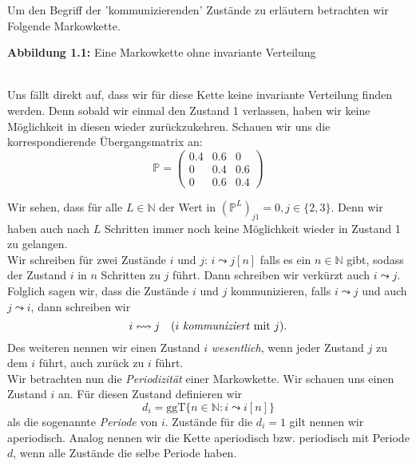 \documentclass[a4paper]{article}
\begin{document}
Um den Begriff der 'kommunizierenden' Zustände zu erläutern betrachten wir Folgende Markowkette.

\begin{center}
\end{center}
\qquad \caption{\textbf{Abbildung 1.1:} Eine Markowkette ohne invariante Verteilung}
\\

Uns fällt direkt auf, dass wir für diese Kette keine invariante Verteilung finden werden. 
Denn sobald wir einmal den Zustand 1 verlassen, haben wir keine Möglichkeit in diesen wieder
zurückzukehren.
Schauen wir uns die korrespondierende Übergangsmatrix an:
\[
\mathbb{P} = \begin{pmatrix} 
	0.4 & 0.6 & 0 \\
	0 & 0.4 & 0.6 \\
	0 & 0.6 & 0.4
\end{pmatrix} 
\]

Wir sehen, dass für alle $L \in \mathbb{N}$ der Wert in $(\mathbb{P} ^{L}) _{j1} = 0, j \in \{
	2, 3
\} $. 
Denn wir haben auch nach $L$ Schritten immer noch keine Möglichkeit wieder in Zustand 1 zu gelangen.
\\

Wir schreiben für zwei Zustände $i$ und $j$: $i \leadsto j [n]$ falls es ein $n \in \mathbb{N}$ gibt, sodass
der Zustand $i$ in $n$ Schritten zu $j$ führt. Dann schreiben wir verkürzt auch $i \leadsto j$.
Folglich sagen wir, dass die Zustände $i$ und $j$ kommunizieren, falls $i \leadsto j$ und auch
$j \leadsto i$, dann schreiben wir
\[
	i \leftrightsquigarrow j \quad \text{($i$ \textit{kommuniziert} mit $j$)}.
\]
Des weiteren nennen wir einen Zustand $i$ \textit{wesentlich}, wenn jeder Zustand $j$ zu dem $i$ führt, auch
zurück zu $i$ führt. 
\\

Wir betrachten nun die \textit{Periodizität}  einer Markowkette.
Wir schauen uns einen Zustand $i$ an. Für diesen Zustand definieren wir
\[
d_i = \text{ggT} \{
	n \in \mathbb{N} : i \leadsto i[n]
\}
\] 
als die sogenannte \textit{Periode} von $i$.
Zustände für die $d_i = 1$ gilt nennen wir aperiodisch.
Analog nennen wir die Kette aperiodisch bzw. periodisch mit Periode $d$, wenn alle Zustände die selbe
Periode haben.
\\
\end{document}
